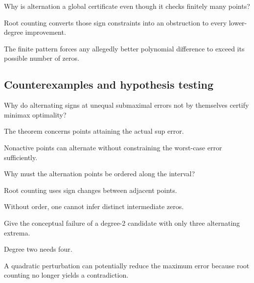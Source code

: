 \begin{exercise}\label{exr:ii23-expand-09}
Why is alternation a global certificate even though it checks finitely many points?
\end{exercise}
\begin{hint}
Root counting converts those sign constraints into an obstruction to every lower-degree improvement.
\end{hint}
\begin{solution}
The finite pattern forces any allegedly better polynomial difference to exceed its possible number of zeros.
\end{solution}

\subsection*{Counterexamples and hypothesis testing}

\begin{exercise}\label{exr:ii23-expand-10}
Why do alternating signs at unequal submaximal errors not by themselves certify minimax optimality?
\end{exercise}
\begin{hint}
The theorem concerns points attaining the actual sup error.
\end{hint}
\begin{solution}
Nonactive points can alternate without constraining the worst-case error sufficiently.
\end{solution}

\begin{exercise}\label{exr:ii23-expand-11}
Why must the alternation points be ordered along the interval?
\end{exercise}
\begin{hint}
Root counting uses sign changes between adjacent points.
\end{hint}
\begin{solution}
Without order, one cannot infer distinct intermediate zeros.
\end{solution}

\begin{exercise}\label{exr:ii23-expand-12}
Give the conceptual failure of a degree-2 candidate with only three alternating extrema.
\end{exercise}
\begin{hint}
Degree two needs four.
\end{hint}
\begin{solution}
A quadratic perturbation can potentially reduce the maximum error because root counting no longer yields a contradiction.
\end{solution}

